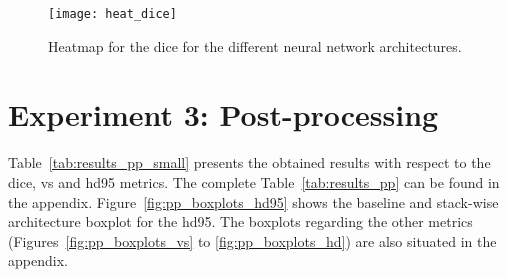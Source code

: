 \begin{figure}[htbp]	
	\centering
	\texttt{[image: heat\_dice]}
    \caption[Heatmap for the \acrlong{dice} of the different Architectures]{Heatmap for the \acrlong{dice} for the different neural network architectures.}
    \label{fig:results_heatmap_dice}
\end{figure}


\section{Experiment 3: Post-processing} \label{sec:exp_pp} %
Table~\ref{tab:results_pp_small} presents the obtained results with respect to the \acrlong{dice}, \acrlong{vs} and \acrlong{hd95} metrics. The complete Table~\ref{tab:results_pp} can be found in the appendix. Figure~\ref{fig:pp_boxplots_hd95} shows the baseline and stack-wise architecture boxplot for the \acrlong{hd95}. The boxplots regarding the other metrics (Figures~\ref{fig:pp_boxplots_vs} to \ref{fig:pp_boxplots_hd}) are also situated in the appendix.

